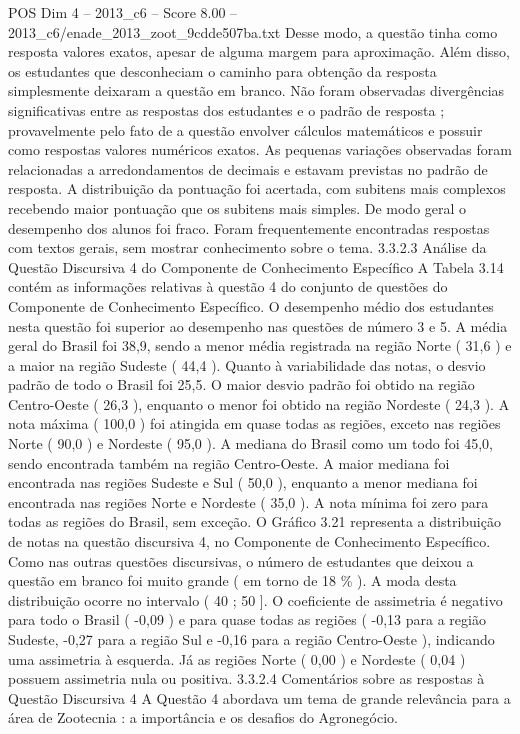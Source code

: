 \begin{textsample}{POS Dim 4 – 2013\_c6 – Score 8.00 – 2013\_c6/enade\_2013\_zoot\_9cdde507ba.txt}
Desse modo, a questão tinha como resposta valores exatos, apesar de alguma margem para aproximação.
Além disso, os estudantes que desconheciam o caminho para obtenção da resposta simplesmente deixaram a questão em branco.
Não foram observadas divergências significativas entre as respostas dos estudantes e o padrão de resposta ; provavelmente pelo fato de a questão envolver cálculos matemáticos e possuir como respostas valores numéricos exatos.
As pequenas variações observadas foram relacionadas a arredondamentos de decimais e estavam previstas no padrão de resposta.
A distribuição da pontuação foi acertada, com subitens mais complexos recebendo maior pontuação que os subitens mais simples.
De modo geral o desempenho dos alunos foi fraco.
Foram frequentemente encontradas respostas com textos gerais, sem mostrar conhecimento sobre o tema. 3.3.2.3 Análise da Questão Discursiva 4 do Componente de Conhecimento Específico A Tabela 3.14 contém as informações relativas à questão 4 do conjunto de questões do Componente de Conhecimento Específico.
O desempenho médio dos estudantes nesta questão foi superior ao desempenho nas questões de número 3 e 5.
A média geral do Brasil foi 38,9, sendo a menor média registrada na região Norte ( 31,6 ) e a maior na região Sudeste ( 44,4 ).
Quanto à variabilidade das notas, o desvio padrão de todo o Brasil foi 25,5.
O maior desvio padrão foi obtido na região Centro-Oeste ( 26,3 ), enquanto o menor foi obtido na região Nordeste ( 24,3 ).
A nota máxima ( 100,0 ) foi atingida em quase todas as regiões, exceto nas regiões Norte ( 90,0 ) e Nordeste ( 95,0 ).
A mediana do Brasil como um todo foi 45,0, sendo encontrada também na região Centro-Oeste.
A maior mediana foi encontrada nas regiões Sudeste e Sul ( 50,0 ), enquanto a menor mediana foi encontrada nas regiões Norte e Nordeste ( 35,0 ).
A nota mínima foi zero para todas as regiões do Brasil, sem exceção.
O Gráfico 3.21 representa a distribuição de notas na questão discursiva 4, no Componente de Conhecimento Específico.
Como nas outras questões discursivas, o número de estudantes que deixou a questão em branco foi muito grande ( em torno de 18 \% ).
A moda desta distribuição ocorre no intervalo ( 40 ; 50 ].
O coeficiente de assimetria é negativo para todo o Brasil ( -0,09 ) e para quase todas as regiões ( -0,13 para a região Sudeste, -0,27 para a região Sul e -0,16 para a região Centro-Oeste ), indicando uma assimetria à esquerda.
Já as regiões Norte ( 0,00 ) e Nordeste ( 0,04 ) possuem assimetria nula ou positiva. 3.3.2.4 Comentários sobre as respostas à Questão Discursiva 4 A Questão 4 abordava um tema de grande relevância para a área de Zootecnia : a importância e os desafios do Agronegócio.

\end{textsample}
